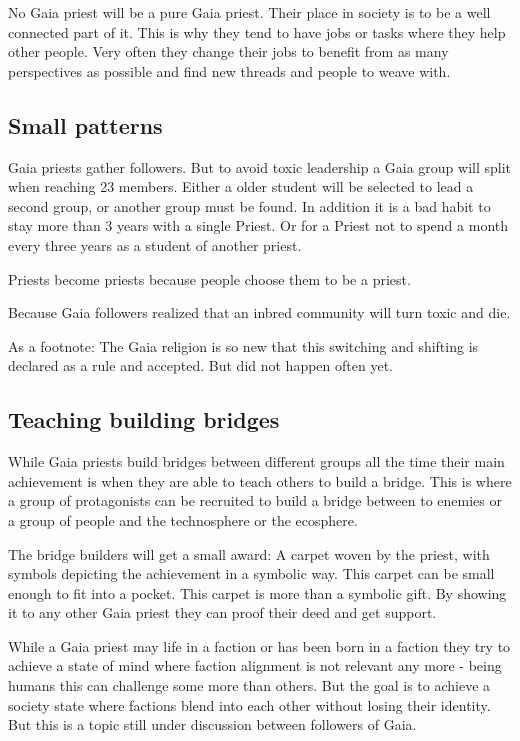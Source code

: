 No Gaia priest will be a pure Gaia priest. Their place in society is to be a well connected part of it. This is why they tend to have jobs or tasks where they help other people. Very often they change their jobs to benefit from as many perspectives as possible and find new threads and people to weave with.

\subsection{Small patterns}

Gaia priests gather followers. But to avoid toxic leadership a Gaia group will split when reaching 23 members. Either a older student will be selected to lead a second group, or another group must be found. In addition it is a bad habit to stay more than 3 years with a single Priest. Or for a Priest not to spend a month every three years as a student of another priest.

Priests become priests because people choose them to be a priest.

Because Gaia followers realized that an inbred community will turn toxic and die.

As a footnote: The Gaia religion is so new that this switching and shifting is declared as a rule and accepted. But did not happen often yet.

\subsection{Teaching building bridges}

While Gaia priests build bridges between different groups all the time their main achievement is when they are able to teach others to build a bridge. This is where a group of protagonists can be recruited to build a bridge between to enemies or a group of people and the technosphere or the ecosphere.

The bridge builders will get a small award: A carpet woven by the priest, with symbols depicting the achievement in a symbolic way. This carpet can be small enough to fit into a pocket. This carpet is more than a symbolic gift. By showing it to any other Gaia priest they can proof their deed and get support.

While a Gaia priest may life in a faction or has been born in a faction they try to achieve a state of mind where faction alignment is not relevant any more - being humans this can challenge some more than others. But the goal is to achieve a society state where factions blend into each other without losing their identity. But this is a topic still under discussion between followers of Gaia.

